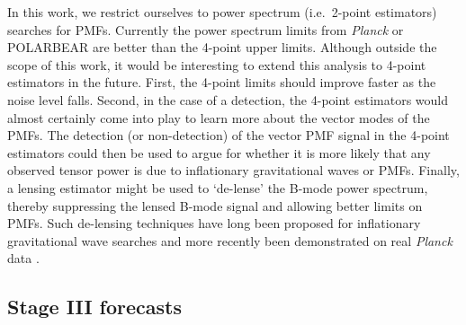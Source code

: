 \documentclass[apj]{emulateapj}
\newcommand{\apmf}{\ensuremath{A_{\rm PMF}}}
\newcommand{\lcdm}{\ensuremath{\Lambda}CDM}
\newcommand{\planck}{{\sl Planck}}
\newcommand{\pb}{POLARBEAR}
\newcommand{\tbd}[1]{\textcolor{Red}{{\bf TBD}: #1}}
\begin{document}
In this work, we restrict ourselves to power spectrum (i.e.~2-point estimators) searches for PMFs. 
Currently the power spectrum limits from \planck{} or \pb{} are better than the 4-point upper limits. 
Although outside the scope of this work, it would be interesting to extend this analysis to 4-point estimators in the future. 
First, the 4-point limits should improve faster as the noise level falls. 
Second, in the case of a detection, the 4-point estimators would almost certainly come into play to learn more about the vector modes of the PMFs. 
The detection (or non-detection) of the vector PMF signal in the 4-point estimators could then be used to argue for whether it is more likely that any observed tensor power is due to  inflationary gravitational waves or  PMFs. 
Finally, a lensing estimator might be used to `de-lense' the B-mode power spectrum, thereby suppressing the lensed B-mode signal and allowing better limits on PMFs. 
Such de-lensing techniques have long been proposed for inflationary gravitational wave searches \citep[e.g.][]{knox02,kesden02,seljak04a,simard15} and more recently been demonstrated on real \planck{} data \citep{larsen16}. 


\subsection{Stage III forecasts}
\end{document}
